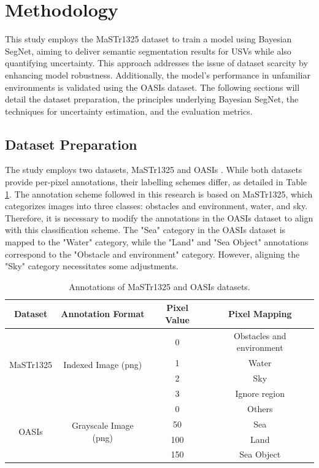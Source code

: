 \section{Methodology}
\label{sectino:Methodology}
This study employs the MaSTr1325 dataset to train a model using Bayesian SegNet, aiming to deliver semantic 
segmentation results for USVs while also quantifying uncertainty. This approach addresses the issue of dataset 
scarcity by enhancing model robustness. Additionally, the model's performance in unfamiliar environments is 
validated using the OASIs dataset. The following sections will detail the dataset preparation, the principles 
underlying Bayesian SegNet, the techniques for uncertainty estimation, and the evaluation metrics.

\subsection{Dataset Preparation}
The study employs two datasets, MaSTr1325 \cite{MaSTr1325} and OASIs \cite{OASIs}. While both datasets provide 
per-pixel annotations, their labelling schemes differ, as detailed in Table \ref{tab:annot-diff}. The annotation 
scheme followed in this research is based on MaSTr1325, which categorizes images into three classes: obstacles 
and environment, water, and sky. Therefore, it is necessary to modify the annotations in the OASIs dataset to 
align with this classification scheme. The "Sea" category in the OASIs dataset is mapped to the "Water" category, 
while the "Land" and "Sea Object" annotations correspond to the "Obstacle and environment" category. However, 
aligning the "Sky" category necessitates some adjustments.

\begin{table}[h!]
    \centering
    \caption{Annotations of MaSTr1325 and OASIs datasets.}
    \label{tab:annot-diff}
    \begin{tabular}{c|c|c|c}
    \textbf{Dataset} & \textbf{Annotation Format} & \textbf{Pixel Value} & \textbf{Pixel Mapping} \\ \hline
    \multirow{4}{*}{MaSTr1325 \cite{MaSTr1325}} & \multirow{4}{*}{Indexed Image (png)} & 0 & Obstacles and environment \\ \cline{3-4}
    & & 1 & Water \\ \cline{3-4}
    & & 2 & Sky \\ \cline{3-4}
    & & 3 & Ignore region \\ \hline
    \multirow{4}{*}{OASIs \cite{OASIs}} & \multirow{4}{*}{Grayscale Image (png)} & 0 & Others \\ \cline{3-4}
    & & 50 & Sea \\ \cline{3-4}
    & & 100 & Land \\ \cline{3-4}
    & & 150 & Sea Object \\ \hline
    \end{tabular}
\end{table}

